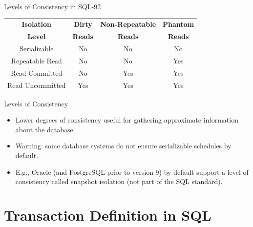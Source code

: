 \documentclass{beamer}
\begin{document}
\begin{frame}{Levels of Consistency in SQL-92}

    \footnotesize
    \centering
    \begin{tabular}{c c c c }
        \toprule
        \textbf{Isolation} & \textbf{Dirty} & \textbf{Non-Repeatable} & \textbf{Phantom} \\
        \textbf{Level} & \textbf{Reads} & \textbf{Reads} & \textbf{Reads} \\
        \midrule
        Serializable             & No                   & No                            & No                    \\
        Repeatable Read          & No                   & No                            & Yes                   \\
        Read Committed           & No                   & Yes                           & Yes                   \\
        Read Uncommitted         & Yes                  & Yes                           & Yes                   \\
        \bottomrule
    \end{tabular}

\end{frame}

\begin{frame}{Levels of Consistency}

    \begin{itemize}
        \item Lower degrees of consistency useful for gathering approximate information about the database.
        \item Warning: some database systems do not ensure serializable schedules by default.
        \item E.g., Oracle (and PostgreSQL prior to version 9) by default support a level of consistency called snapshot isolation (not part of the SQL standard).
    \end{itemize}

\end{frame}

\section{Transaction Definition in SQL}
\end{document}
